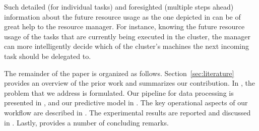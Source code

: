 Such detailed (for individual tasks) and foresighted (multiple steps ahead)
information about the future resource usage as the one depicted in
 can be of great help to the resource manager. For instance,
knowing the future resource usage of the tasks that are currently being executed
in the cluster, the manager can more intelligently decide which of the cluster's
machines the next incoming task should be delegated to.

The remainder of the paper is organized as follows. Section~\ref{sec:literature}
provides an overview of the prior work and summarizes our contribution. In
, the problem that we address is formulated. Our pipeline for data
processing is presented in , and our predictive model in
. The key operational aspects of our workflow are described in
. The experimental results are reported and discussed in
. Lastly,  provides a number of concluding
remarks.
